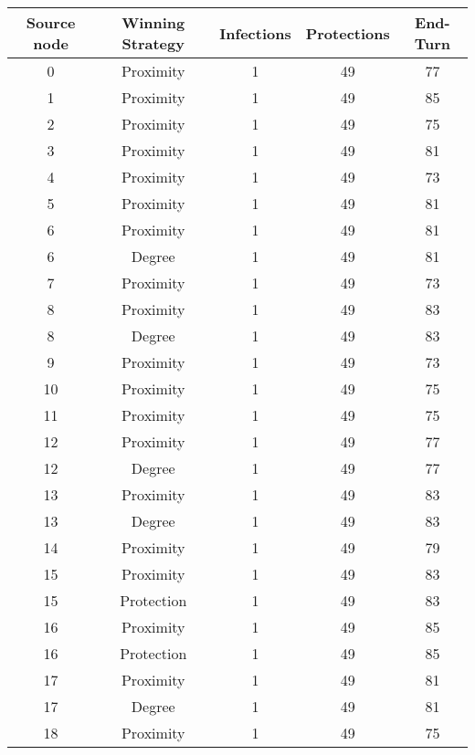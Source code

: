 \documentclass[results.tex]{subfiles}
\begin{document}
\begin{center}
  \begin{tabular}{| c || c | c | c | c |}
    \hline
    {\bfseries Source node} & {\bfseries Winning Strategy} & {\bfseries Infections} & {\bfseries Protections} & {\bfseries End-Turn} \\  %
    \hline\hline
    0 & Proximity & 1 & 49 & 77 \\ 
    \hline
    1 & Proximity & 1 & 49 & 85 \\ 
    \hline
    2 & Proximity & 1 & 49 & 75 \\ 
    \hline
    3 & Proximity & 1 & 49 & 81 \\ 
    \hline
    4 & Proximity & 1 & 49 & 73 \\ 
    \hline
    5 & Proximity & 1 & 49 & 81 \\ 
    \hline
    6 & Proximity & 1 & 49 & 81 \\ 
    \hline
    6 & Degree & 1 & 49 & 81 \\ 
    \hline
    7 & Proximity & 1 & 49 & 73 \\ 
    \hline
    8 & Proximity & 1 & 49 & 83 \\ 
    \hline
    8 & Degree & 1 & 49 & 83 \\ 
    \hline
    9 & Proximity & 1 & 49 & 73 \\ 
    \hline
    10 & Proximity & 1 & 49 & 75 \\ 
    \hline
    11 & Proximity & 1 & 49 & 75 \\ 
    \hline
    12 & Proximity & 1 & 49 & 77 \\ 
    \hline
    12 & Degree & 1 & 49 & 77 \\ 
    \hline
    13 & Proximity & 1 & 49 & 83 \\ 
    \hline
    13 & Degree & 1 & 49 & 83 \\ 
    \hline
    14 & Proximity & 1 & 49 & 79 \\ 
    \hline
    15 & Proximity & 1 & 49 & 83 \\ 
    \hline
    15 & Protection & 1 & 49 & 83 \\ 
    \hline
    16 & Proximity & 1 & 49 & 85 \\ 
    \hline
    16 & Protection & 1 & 49 & 85 \\ 
    \hline
    17 & Proximity & 1 & 49 & 81 \\ 
    \hline
    17 & Degree & 1 & 49 & 81 \\ 
    \hline
    18 & Proximity & 1 & 49 & 75 \\ 

\end{tabular}
\end{center}
\end{document}
